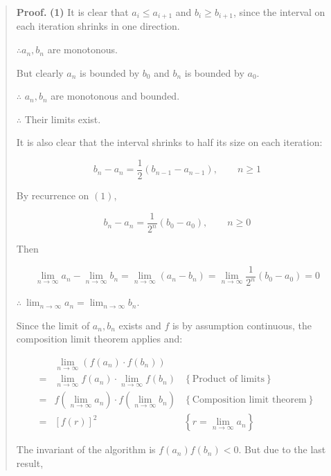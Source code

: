 \documentclass[12pt]{article}
\theoremstyle{definition}
\begin{document}
\small
\begin{quote}

\textbf{Proof.} \textbf{(1)} It is clear that $a_i \leq a_{i+1}$ and $b_i \geq b_{i+1}$,
since the interval on each iteration shrinks in one direction. 

$\therefore a_n, b_n$ are monotonous. 

But clearly $a_n$ is bounded by $b_0$ and $b_n$ is bounded by $a_0$. 

$\therefore $ $a_n, b_n$ are monotonous and bounded. 

$\therefore $ Their limits exist.

It is also clear that the interval shrinks to half its size on each iteration: 

\begin{equation}
    b_n - a_n = \frac{1}{2} (b_{n-1} - a_{n-1}), \qquad n \geq 1
\end{equation}

By recurrence on $(1)$,

\begin{equation}
    b_n - a_n = \frac{1}{2^n}(b_0 - a_0), \qquad n \geq 0
\end{equation}

Then 

\begin{equation}
   \lim_{n \to \infty} a_n - \lim_{n \to \infty} b_n = \lim_{n \to \infty} (a_n - b_n) 
    = \lim_{n \to \infty}  \frac{1}{2^n}(b_0 - a_0) = 0
\end{equation}

$\therefore ~ \lim_{n \to \infty} a_n = \lim_{n \to \infty} b_n$.


Since the limit of $a_n, b_n$ exists and $f$ is by assumption continuous, the
composition limit theorem applies and:

\begin{align}
    &\lim_{n \to \infty} \left( f(a_n) \cdot f(b_n) \right) \nonumber
\\
    =& \lim_{n \to \infty}    f(a_n) \cdot \lim_{n \to \infty} f(b_n) &\left\{ \text{Product of limits} \right\}  \nonumber \\ 
    =& f\left( \lim_{n \to \infty} a_n
\right) \cdot f\left( \lim_{n \to \infty} b_n \right)  &\left\{
\text{Composition limit theorem} \right\} \nonumber \\ 
    =& \left[ f(r) \right]^2 &\left\{ r = \lim_{n \to \infty} a_n \right\} 
\end{align}

The invariant of the algorithm is $f(a_n)f(b_n) < 0$. But due to the last
result,


\end{quote}
\end{document}
